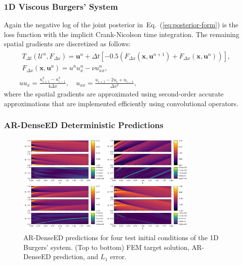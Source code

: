 \documentclass{beamer}
\theoremstyle{remark}
\newcommand{\viscosity}{\nu}
\def\Eqref#1{Eq.~(\ref{#1})}
\begin{document}
\begin{frame}
\frametitle{1D Viscous Burgers' System}
Again the negative log of the joint posterior in~\Eqref{eq:posterior-form} is the loss function with the implicit Crank-Nicolson time integration.
The remaining spatial gradients are discretized as follows:
\begin{gather}
    \begin{gathered}T_{\Delta t}(\bm{\mathcal{U}}^{n}, F_{\Delta x}) = \bm{u}^{n} + \Delta t \left[-0.5\left(F_{\Delta x}(\bm{x}, \bm{u}^{n+1}) + F_{\Delta x}(\bm{x}, \bm{u}^{n})\right)\right],\\
    F_{\Delta x}(\bm{x}, \bm{u}^{n}) = u^{n}u^{n}_{x} - \viscosity u^{n}_{xx},\end{gathered}\\
    uu_{x} = \frac{u^{2}_{i+1} - u^{2}_{i-1}}{4\Delta x}, \quad u_{xx} = \frac{u_{i+1} - 2u_{i} + u_{i-1}}{\Delta x^{2}},
\end{gather}
where the spatial gradients are approximated using second-order accurate approximations that are implemented efficiently using convolutional operators.
\end{frame}

\begin{frame}
\frametitle{AR-DenseED Deterministic Predictions}
\begin{figure}[H]
    \centering
    \includegraphics[width=0.8\textwidth]{Fig10.png}
    \caption{AR-DenseED predictions for four test initial conditions of the 1D Burgers' system. (Top to bottom) FEM target solution, AR-DenseED prediction, and $L_1$ error.}
    \label{fig:burgers1D-ARDenseED}
\end{figure}
\end{frame}
\end{document}
